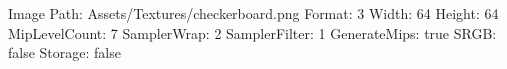Image Path: Assets/Textures/checkerboard.png
Format: 3
Width: 64
Height: 64
MipLevelCount: 7
SamplerWrap: 2
SamplerFilter: 1
GenerateMips: true
SRGB: false
Storage: false